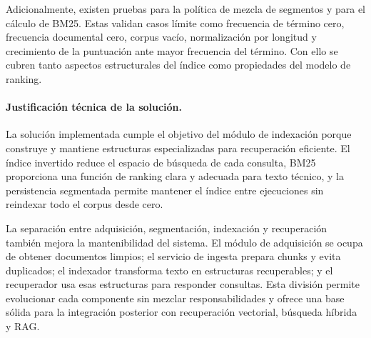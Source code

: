 \documentclass[11pt]{article}
\begin{document}
Adicionalmente, existen pruebas para la política de mezcla de segmentos y para el cálculo de
BM25. Estas validan casos límite como frecuencia de término cero, frecuencia documental cero,
corpus vacío, normalización por longitud y crecimiento de la puntuación ante mayor frecuencia
del término. Con ello se cubren tanto aspectos estructurales del índice como propiedades del
modelo de ranking.

\paragraph{Justificación técnica de la solución.}
La solución implementada cumple el objetivo del módulo de indexación porque construye y mantiene
estructuras especializadas para recuperación eficiente. El índice invertido reduce el espacio de
búsqueda de cada consulta, BM25 proporciona una función de ranking clara y adecuada para texto
técnico, y la persistencia segmentada permite mantener el índice entre ejecuciones sin reindexar
todo el corpus desde cero.

La separación entre adquisición, segmentación, indexación y recuperación también mejora la
mantenibilidad del sistema. El módulo de adquisición se ocupa de obtener documentos limpios; el
servicio de ingesta prepara chunks y evita duplicados; el indexador transforma texto en
estructuras recuperables; y el recuperador usa esas estructuras para responder consultas. Esta
división permite evolucionar cada componente sin mezclar responsabilidades y ofrece una base
sólida para la integración posterior con recuperación vectorial, búsqueda híbrida y RAG.
\end{document}
